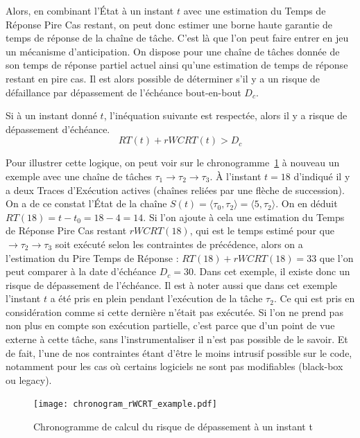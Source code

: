 \documentclass[french, a4paper, 11pt, twoside, pdftex]{StyleThese}
\begin{document}
    Alors, en combinant l'État à un instant $t$ avec une estimation du Temps de Réponse Pire Cas restant, on peut donc estimer une borne haute garantie de temps de réponse de la chaîne de tâche. C'est là que l'on peut faire entrer en jeu un mécanisme d'anticipation. 
    On dispose pour une chaîne de tâches donnée de son temps de réponse partiel actuel ainsi qu'une estimation de temps de réponse restant en pire cas. Il est alors possible de déterminer s'il y a un risque de défaillance par dépassement de l'échéance bout-en-bout $D_c$.
    \begin{theorem}
    	Si à un instant donné $t$, l'inéquation suivante est respectée, alors il y a risque de dépassement d'échéance.
    	\begin{equation*} 
    		RT(t) + rWCRT(t) > D_c
    	\end{equation*}
    \end{theorem}

	Pour illustrer cette logique, on peut voir sur le chronogramme~\ref{fig:chronogram_rWCRT_example} à nouveau un exemple avec une chaîne de tâches $\tau_1 \rightarrow \tau_2 \rightarrow \tau_3$. À l'instant $t=18$ d'indiqué il y a deux Traces d'Exécution actives (chaînes reliées par une flèche de succession). On a de ce constat l'État de la chaîne $S(t) = \langle \tau_0, \tau_2\rangle = \langle 5, \tau_{2} \rangle $.
	On en déduit $ RT(18) = t - t_0 = 18-4 = 14 $. Si l'on ajoute à cela une estimation du Temps de Réponse Pire Cas restant $rWCRT(18)$, qui est le temps estimé pour que $\rightarrow \tau_2 \rightarrow \tau_3$ soit exécuté selon les contraintes de précédence, alors on a l'estimation du Pire Temps de Réponse : $ RT(18) + rWCRT(18) = 33$ que l'on peut comparer à la date d'échéance $ D_c = 30 $. Dans cet exemple, il existe donc un risque de dépassement de l'échéance.
	Il est à noter aussi que dans cet exemple l'instant $t$ a été pris en plein pendant l'exécution de la tâche $ \tau_2 $. Ce qui est pris en considération comme si cette dernière n'était pas exécutée. Si l'on ne prend pas non plus en compte son exécution partielle, c'est parce que d'un point de vue externe à cette tâche, sans l'instrumentaliser il n'est pas possible de le savoir. Et de fait, l'une de nos contraintes étant d'être le moins intrusif possible sur le code, notamment pour les cas où certains logiciels ne sont pas modifiables (black-box ou legacy). 
	
    \begin{figure}[ht]
		\centering 
		\texttt{[image: chronogram\_rWCRT\_example.pdf]}
		\caption{Chronogramme de calcul du risque de dépassement à un instant t}
		\label{fig:chronogram_rWCRT_example}
	\end{figure}
\end{document}
